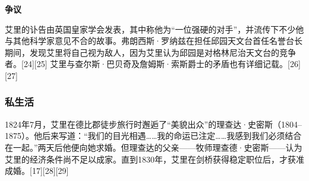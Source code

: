 \textbf{争议}

艾里的讣告由英国皇家学会发表，其中称他为“一位强硬的对手”，并流传下不少他与其他科学家意见不合的故事。弗朗西斯·罗纳兹在担任邱园天文台首任名誉台长期间，发现艾里将自己视为敌人，因为艾里认为邱园是对格林尼治天文台的竞争者。[24][25] 艾里与查尔斯·巴贝奇及詹姆斯·索斯爵士的矛盾也有详细记载。[26][27]
\subsubsection{私生活}
1824年7月，艾里在德比郡徒步旅行时邂逅了“美貌出众”的理查达·史密斯（1804–1875）。他后来写道：“我们的目光相遇……我的命运已注定……我感到我们必须结合在一起。”两天后他便向她求婚。但理查达的父亲——牧师理查德·史密斯——认为艾里的经济条件尚不足以成家。直到1830年，艾里在剑桥获得稳定职位后，才获准成婚。[17][28][29]
